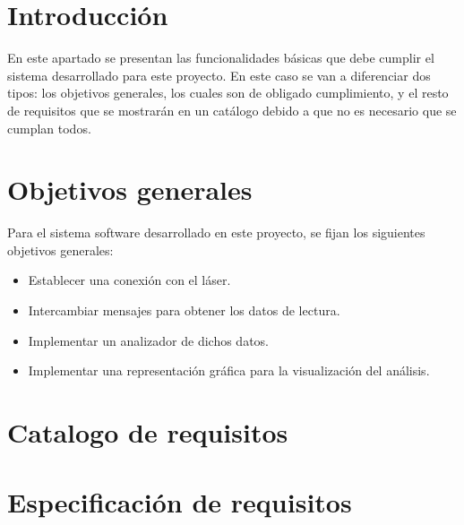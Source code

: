 
\section{Introducción}
En este apartado se presentan las funcionalidades básicas que debe cumplir el sistema desarrollado para este proyecto. En este caso se van a diferenciar dos tipos: los objetivos generales, los cuales son de obligado cumplimiento, y el resto de requisitos que se mostrarán en un catálogo debido a que  no es necesario que se cumplan todos.

\section{Objetivos generales}
Para el sistema software desarrollado en este proyecto, se fijan los siguientes objetivos generales:
\begin{itemize}
	\item Establecer una conexión con el láser.
	\item Intercambiar mensajes para obtener los datos de lectura.
	\item Implementar un analizador de dichos datos.
	\item Implementar una representación gráfica para la visualización del análisis.
\end{itemize}
\section{Catalogo de requisitos}

\section{Especificación de requisitos}


